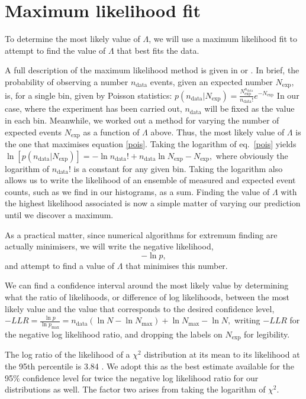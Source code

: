 \section{Maximum likelihood fit}
To determine the most likely value of $\Lambda$, we will use a maximum likelihood fit to attempt to find the value of $\Lambda$ that best fits the data.

A full description of the maximum likelihood method is given in \cite{barlow} or \cite{pdg}. In brief, the probability of observing a number $n_\text{data}$ events, given an expected number $N_\text{exp}$, is, for a single bin, given by Poisson statistics:
\(p(n_\text{data}|N_\text{exp})=\frac{N_\text{exp}^{n_\text{data}}}{n_\text{data}!}e^{-N_\text{exp}}\label{pois}\)
In our case, where the experiment has been carried out, $n_\text{data}$ will be fixed as the value in each bin. Meanwhile, we worked out a method for varying the number of expected events $N_\text{exp}$ as a function of $\Lambda$ above. Thus, the most likely value of $\Lambda$ is the one that maximises equation \eqref{pois}. Taking the logarithm of eq.~\eqref{pois} yields
\(\ln[p(n_\text{data}|N_\text{exp})]=-\ln n_\text{data}!+n_\text{data}\ln N_\text{exp}-N_\text{exp},\)
where obviously the logarithm of $n_\text{data}!$ is a constant for any given bin. Taking the logarithm also allows us to write the likelihood of an ensemble of measured and expected event counts, such as we find in our histograms, as a sum. Finding the value of $\Lambda$ with the highest likelihood associated is now a simple matter of varying our prediction until we discover a maximum.

As a practical matter, since numerical algorithms for extremum finding are actually minimisers, we will write the negative likelihood,
\[-\ln p,\]
and attempt to find a value of $\Lambda$ that minimises this number. 

We can find a confidence interval around the most likely value by determining what the ratio of likelihoods, or difference of log likelihoods, between the most likely value and the value that corresponds to the desired confidence level,
\(-LLR=\frac{\ln p}{\ln p_\text{max}}=n_\text{data}(\ln N-\ln N_\text{max})+\ln N_\text{max}-\ln N,\)
writing $-LLR$ for the negative log likelihood ratio, and dropping the labels on $N_\text{exp}$ for legibility.

The log ratio of the likelihood of a $\chi^2$ distribution at its mean to its likelihood at the 95th percentile is 3.84 \cite{pdg}. We adopt this as the best estimate available for the 95\% confidence level for twice the negative log likelihood ratio for our distributions as well. The factor two arises from taking the logarithm of $\chi^2$.

